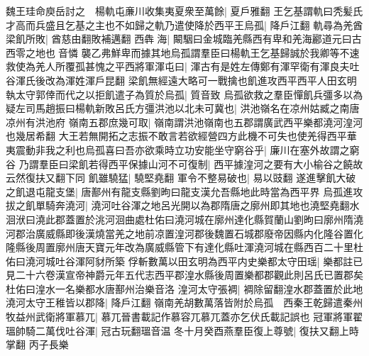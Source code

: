 魏王珪命庾岳討之　楊軌屯亷川收集夷夏衆至萬餘|{
	夏戶雅翻}
王乞基謂軌曰秃髪氏才高而兵盛且乞基之主也不如歸之軌乃遣使降於西平王烏孤|{
	降戶江翻}
軌尋為羌酋梁飢所敗|{
	酋慈由翻敗補邁翻}
西犇海|{
	闞駰曰金城臨羌縣西有卑和羌海酈道元曰古西零之地也音憐}
襲乙弗鮮卑而據其地烏孤謂羣臣曰楊軌王乞基歸誠於我卿等不速救使為羌人所覆孤甚愧之平西將軍渾屯曰|{
	渾古有是姓左傳鄭有渾罕衛有渾良夫吐谷渾氏後改為渾姓渾戶昆翻}
梁飢無經遠大略可一戰擒也飢進攻西平西平人田玄明執太守郭倖而代之以拒飢遣子為質於烏孤|{
	質音致}
烏孤欲救之羣臣憚飢兵彊多以為疑左司馬趙振曰楊軌新敗呂氏方彊洪池以北未可冀也|{
	洪池嶺名在凉州姑臧之南唐凉州有洪池府}
嶺南五郡庶幾可取|{
	嶺南謂洪池嶺南也五郡謂廣武西平樂都澆河湟河也幾居希翻}
大王若無開拓之志振不敢言若欲經營四方此機不可失也使羌得西平華夷震動非我之利也烏孤喜曰吾亦欲乘時立功安能坐守窮谷乎|{
	廉川在塞外故謂之窮谷}
乃謂羣臣曰梁飢若得西平保據山河不可復制|{
	西平據湟河之要有大小榆谷之饒故云然復扶又翻下同}
飢雖驍猛|{
	驍堅堯翻}
軍令不整易破也|{
	易以豉翻}
遂進擊飢大破之飢退屯龍支堡|{
	唐鄯州有龍支縣劉昫曰龍支漢允吾縣地此時當為西平界}
烏孤進攻拔之飢單騎奔澆河|{
	澆河吐谷渾之地呂光開以為郡隋唐之廓州即其地也澆堅堯翻水洄洑曰澆此郡蓋置於洮河洄曲處杜佑曰澆河城在廓州達化縣賀蘭山劉昫曰廓州隋澆河郡治廣威縣即後漢燒當羌之地前凉置湟河郡後魏置石城郡廢帝因縣内化隆谷置化隆縣後周置廓州唐天寶元年改為廣威縣管下有達化縣吐渾澆河城在縣西百二十里杜佑曰澆河城吐谷渾阿豺所築}
俘斬數萬以田玄明為西平内史樂都太守田瑶|{
	樂都註已見二十六卷漢宣帝神爵元年五代志西平郡湟水縣後周置樂都郡觀此則呂氏已置郡矣杜佑曰湟水一名樂都水唐鄯州治樂音洛}
湟河太守張裯|{
	裯除留翻湟水郡蓋置於此地}
澆河太守王稚皆以郡降|{
	降戶江翻}
嶺南羌胡數萬落皆附於烏孤　西秦王乾歸遣秦州牧益州武衛將軍慕兀|{
	慕兀晉書載記作慕容兀慕兀蓋亦乞伏氏載記誤也}
冠軍將軍翟瑥帥騎二萬伐吐谷渾|{
	冠古玩翻瑥音温}
冬十月癸酉燕羣臣復上尊號|{
	復扶又翻上時掌翻}
丙子長樂

